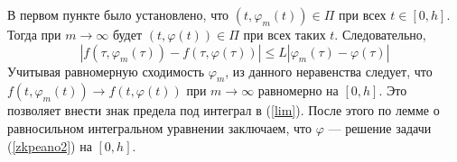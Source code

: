 \begin{enumerate}
    В первом пункте было установлено, что $(t, \varphi_m(t)) \in \Pi$ при всех $t \in [0,h]$. Тогда при $m \to \infty$ будет $(t, \varphi(t)) \in \Pi$ при всех таких $t$. Следовательно,
    \begin{equation*}
        |f(\tau, \varphi_m(\tau)) - f(\tau, \varphi(\tau))| \le L|\varphi_m(\tau) - \varphi(\tau)|
    \end{equation*}
    Учитывая равномерную сходимость $\varphi_m$, из данного неравенства следует, что $f(t, \varphi_m(t)) \to f(t, \varphi(t))$ при $m \to \infty$ равномерно на $[0,h]$. Это позволяет внести знак предела под интеграл в (\ref{lim}). После этого по лемме о равносильном интегральном уравнении заключаем, что $\varphi$ --- решение задачи (\ref{zkpeano2}) на $[0,h]$.
\end{enumerate}
